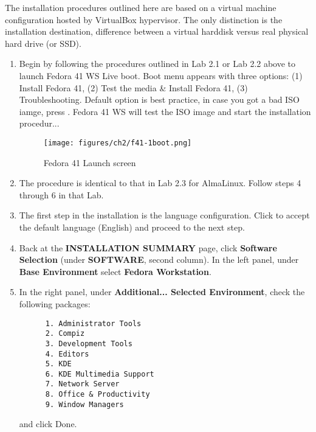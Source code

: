 The installation procedures outlined here are based on a virtual machine configuration hosted by VirtualBox hypervisor. The only distinction is the installation destination, difference between a virtual harddisk versus real physical hard drive (or SSD).

\begin{enumerate}

\subsubsection*{Installation} 

\item Begin by following the procedures outlined in Lab 2.1 or Lab 2.2 above to launch Fedora 41 WS Live boot. Boot menu appears with three options: (1) Install Fedora 41, (2) Test the media \& Install Fedora 41, (3) Troubleshooting. Default option is best practice, in case you got a bad ISO iamge, press {}. Fedora 41 WS will test the ISO image and start the installation procedur...   

\begin{figure}[hbt!]\centering
   \texttt{[image: figures/ch2/f41-1boot.png]}
   \caption{Fedora 41 Launch screen} \label{fig:f41-firstboot} %
\end{figure}

\item The procedure is identical to that in Lab 2.3 for AlmaLinux. Follow steps 4 through 6 in that Lab. 

\item The first step in the installation is the language configuration. Click {} to accept the default language (English) and proceed to the next step.

\item Back at the {\bf{INSTALLATION SUMMARY}} page, click {\bf{Software Selection}} (under {\bf{SOFTWARE}}, second column). In the left panel, under {\bf{Base Environment}} select {\bf{Fedora Workstation}}. 
\item In the right panel, under {\bf{Additional... Selected Environment}}, check the following packages: 
\begin{verbatim}
      1. Administrator Tools 
      2. Compiz
      3. Development Tools
      4. Editors
      5. KDE 
      6. KDE Multimedia Support 
      7. Network Server 
      8. Office & Productivity 
      9. Window Managers 
\end{verbatim}
and click Done. 


\end{enumerate}
